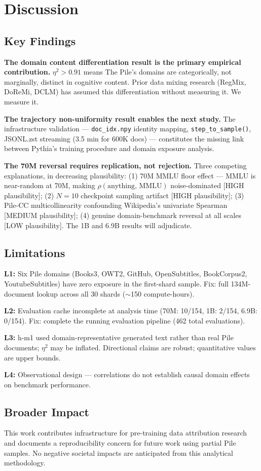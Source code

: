 \section{Discussion}
\label{sec:discussion}

\subsection{Key Findings}

\textbf{The domain content differentiation result is the primary empirical contribution.} $\eta^2 > 0.91$ means The Pile's domains are categorically, not marginally, distinct in cognitive content. Prior data mixing research (RegMix, DoReMi, DCLM) has assumed this differentiation without measuring it. We measure it.

\textbf{The trajectory non-uniformity result enables the next study.} The infrastructure validation --- \texttt{doc\_idx.npy} identity mapping, \texttt{step\_to\_sample()}, JSONL.zst streaming (3.5 min for 600K docs) --- constitutes the missing link between Pythia's training procedure and domain exposure analysis.

\textbf{The 70M reversal requires replication, not rejection.} Three competing explanations, in decreasing plausibility: (1) 70M MMLU floor effect --- MMLU is near-random at 70M, making $\rho(\text{anything, MMLU})$ noise-dominated [HIGH plausibility]; (2) $N=10$ checkpoint sampling artifact [HIGH plausibility]; (3) Pile-CC multicollinearity confounding Wikipedia's univariate Spearman [MEDIUM plausibility]; (4) genuine domain-benchmark reversal at all scales [LOW plausibility]. The 1B and 6.9B results will adjudicate.

\subsection{Limitations}

\textbf{L1:} Six Pile domains (Books3, OWT2, GitHub, OpenSubtitles, BookCorpus2, YoutubeSubtitles) have zero exposure in the first-shard sample. Fix: full 134M-document lookup across all 30 shards ($\sim$150 compute-hours).

\textbf{L2:} Evaluation cache incomplete at analysis time (70M: 10/154, 1B: 2/154, 6.9B: 0/154). Fix: complete the running evaluation pipeline (462 total evaluations).

\textbf{L3:} h-m1 used domain-representative generated text rather than real Pile documents; $\eta^2$ may be inflated. Directional claims are robust; quantitative values are upper bounds.

\textbf{L4:} Observational design --- correlations do not establish causal domain effects on benchmark performance.

\subsection{Broader Impact}

This work contributes infrastructure for pre-training data attribution research and documents a reproducibility concern for future work using partial Pile samples. No negative societal impacts are anticipated from this analytical methodology.
